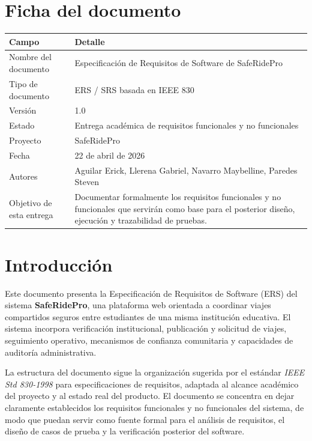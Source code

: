 \documentclass[12pt]{article}
\begin{document}
\clearpage
{}
\tableofcontents
\newpage

\section*{Ficha del documento}

\begin{longtable}{|P{3.2cm}|P{11.2cm}|}
\hline
{}
\textbf{Campo} & \textbf{Detalle} \\
\hline
Nombre del documento & Especificaci\'on de Requisitos de Software de SafeRidePro \\
\hline
Tipo de documento & ERS / SRS basada en IEEE 830 \\
\hline
Versi\'on & 1.0 \\
\hline
Estado & Entrega acad\'emica de requisitos funcionales y no funcionales \\
\hline
Proyecto & SafeRidePro \\
\hline
Fecha & 22 de abril de 2026 \\
\hline
Autores & Aguilar Erick, Llerena Gabriel, Navarro Maybelline, Paredes Steven \\
\hline
Objetivo de esta entrega & Documentar formalmente los requisitos funcionales y no funcionales que servir\'an como base para el posterior dise\~no, ejecuci\'on y trazabilidad de pruebas. \\
\hline
\end{longtable}

\newpage
{}

\section{Introducci\'on}

Este documento presenta la Especificaci\'on de Requisitos de Software (ERS) del sistema \textbf{SafeRidePro}, una plataforma web orientada a coordinar viajes compartidos seguros entre estudiantes de una misma instituci\'on educativa. El sistema incorpora verificaci\'on institucional, publicaci\'on y solicitud de viajes, seguimiento operativo, mecanismos de confianza comunitaria y capacidades de auditor\'ia administrativa.

La estructura del documento sigue la organizaci\'on sugerida por el est\'andar \textit{IEEE Std 830-1998} para especificaciones de requisitos, adaptada al alcance acad\'emico del proyecto y al estado real del producto. El documento se concentra en dejar claramente establecidos los requisitos funcionales y no funcionales del sistema, de modo que puedan servir como fuente formal para el an\'alisis de requisitos, el dise\~no de casos de prueba y la verificaci\'on posterior del software.
\end{document}
